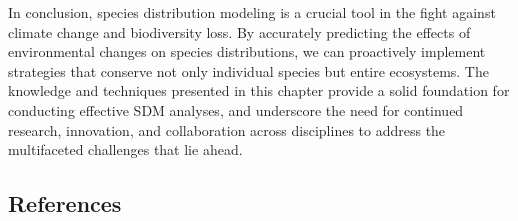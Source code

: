 \documentclass[
]{article}
\begin{document}
In conclusion, species distribution modeling is a crucial tool in the
fight against climate change and biodiversity loss. By accurately
predicting the effects of environmental changes on species
distributions, we can proactively implement strategies that conserve not
only individual species but entire ecosystems. The knowledge and
techniques presented in this chapter provide a solid foundation for
conducting effective SDM analyses, and underscore the need for continued
research, innovation, and collaboration across disciplines to address
the multifaceted challenges that lie ahead.

\subsection*{References}\label{references}
\end{document}

